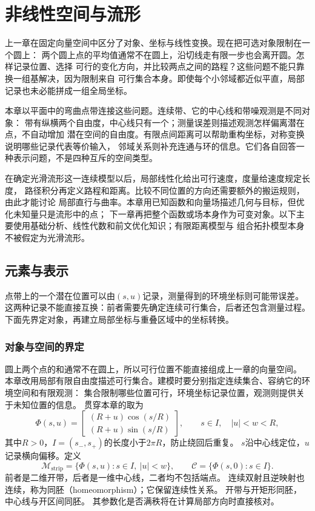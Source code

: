 \chapter{非线性空间与流形}
\label{chap:differential-geometry-and-symmetry}

上一章在固定向量空间中区分了对象、坐标与线性变换。现在把可选对象限制在一个圆上：
两个圆上点的平均值通常不在圆上，沿切线走有限一步也会离开圆。怎样记录位置、选择
可行的变化方向，并比较两点之间的路程？这些问题不能只靠换一组基解决，因为限制来自
可行集合本身。即使每个小邻域都近似平直，局部记录也未必能拼成一组全局坐标。

本章以平面中的弯曲点带连接这些问题。连续带、它的中心线和带噪观测是不同对象：
带有纵横两个自由度，中心线只有一个；测量误差则描述观测怎样偏离潜在点，不自动增加
潜在空间的自由度。有限点间距离可以帮助重构坐标，对称变换说明哪些记录代表等价输入，
邻域关系则补充连通与环的信息。它们各自回答一种表示问题，不是四种互斥的空间类型。

在确定光滑流形这一连续模型以后，局部线性化给出可行速度，度量给速度规定长度，
路径积分再定义路程和距离。比较不同位置的方向还需要额外的搬运规则，由此才能讨论
局部直行与曲率。本章用已知函数和向量场描述几何与目标，但优化未知量只是流形中的点；
下一章再把整个函数或场本身作为可变对象。以下主要使用基础分析、线性代数和前文优化知识；有限距离模型与
组合拓扑模型本身不被假定为光滑流形。

\section{元素与表示}
\label{sec:geometry-nonlinear-representations}

点带上的一个潜在位置可以由$(s,u)$记录，测量得到的环境坐标则可能带误差。
这两种记录不能直接互换：前者需要先确定连续可行集合，后者还包含测量过程。
下面先界定对象，再建立局部坐标与重叠区域中的坐标转换。

\subsection{对象与空间的界定}
\label{sec:geometry-objects}

圆上两个点的和通常不在圆上，所以可行位置不能直接组成上一章的向量空间。
本章改用局部有限自由度描述可行集合。建模时要分别指定连续集合、容纳它的环境空间和有限观测：
集合限制哪些位置可行，环境坐标记录位置，观测则提供关于未知位置的信息。
贯穿本章的取为
\begin{equation}
 \Phi(s,u)=
 \begin{bmatrix}
 (R+u)\cos(s/R)\\(R+u)\sin(s/R)
 \end{bmatrix},
 \qquad s\in I,\quad |u|<w<R,
 \label{eq:geometry-curved-strip-parameterization}
\end{equation}
其中$R>0$，$I=(s_-,s_+)$的长度小于$2\pi R$，防止绕回后重复。
$s$沿中心线定位，$u$记录横向偏移。定义
\[
 \mathcal M_{\mathrm{strip}}=\{\Phi(s,u):s\in I,\ |u|<w\},
 \qquad \mathcal C=\{\Phi(s,0):s\in I\}.
\]
前者是二维开带，后者是一维中心线，二者均不包括端点。
连续双射且逆映射也连续，称为同胚（homeomorphism）；它保留连续性关系。
开带与开矩形同胚，中心线与开区间同胚。
其参数化是否满秩将在计算局部方向时直接核对。

